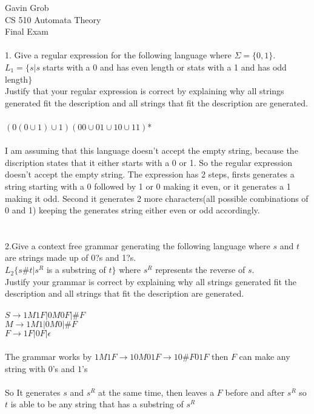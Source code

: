 \documentclass[11pt, oneside]{article}   	%
\begin{document}
\noindent Gavin Grob
\\CS 510 Automata Theory
\\Final Exam
\\
\\1. Give a regular expression for the following language where $\Sigma = \{0,1\}$. 
\\$L_1 = \{ s | s$ starts with a 0 and has even length or stats with a 1 and has odd length$\}$ 
\\Justify that your regular expression is correct by explaining why all strings generated fit the description and all strings that fit the description are generated.
\\
\\$(0(0 \cup 1) \cup 1) (00 \cup 01 \cup 10 \cup 11)$*
\\
\\I am assuming that this language doesn't accept the empty string, because the discription states that it either starts with a 0 or 1. So the regular expression doesn't accept the empty string. The expression has 2 steps, firsts generates a string starting with a 0 followed by 1 or 0 making it even, or it generates a 1 making it odd. Second it generates 2 more characters(all possible combinations of 0 and 1) keeping the generates string either even or odd accordingly.
\\
\\
\\2.Give a context free grammar generating the following language where $s$ and $t$ are strings made up of 0?s and 1?s.
\\$L_2 \{ s\#t | s^R$ is a substring of $t \}$ where $s^R$ represents the reverse of $s$.
\\Justify your grammar is correct by explaining why all strings generated fit the description and all strings that fit the description are generated.
\\
\\$S \rightarrow 1M1F | 0M0F | \# F$
\\$M \rightarrow 1M1 | 0M0 | \# F$
\\$F \rightarrow 1F | 0F | \epsilon$
\\
\\The grammar works by $1M1F  \rightarrow 10M01F  \rightarrow 10\#F01F$ then $F$ can make any string with $0$'s and $1$'s 
\\
\\So It generates $s$ and $s^R$ at the same time, then leaves a $F$ before and after $s^R$ so $t$ is able to be any string that has a substring of $s^R$
\end{document}
